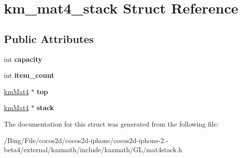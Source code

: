 \hypertarget{structkm__mat4__stack}{\section{km\-\_\-mat4\-\_\-stack Struct Reference}
\label{structkm__mat4__stack}
}
\subsection*{Public Attributes}
\begin{DoxyCompactItemize}
\item 
\hypertarget{structkm__mat4__stack_a069785a0a19481b635a91076f78547c7}{int {\bfseries capacity}}\label{structkm__mat4__stack_a069785a0a19481b635a91076f78547c7}

\item 
\hypertarget{structkm__mat4__stack_aa29b07b2cae7bb1a8fbb699ec0ee3383}{int {\bfseries item\-\_\-count}}\label{structkm__mat4__stack_aa29b07b2cae7bb1a8fbb699ec0ee3383}

\item 
\hypertarget{structkm__mat4__stack_a487ba8aa0a0176eb21899bd8bc38f153}{\hyperlink{structkm_mat4}{km\-Mat4} $\ast$ {\bfseries top}}\label{structkm__mat4__stack_a487ba8aa0a0176eb21899bd8bc38f153}

\item 
\hypertarget{structkm__mat4__stack_aa8b2b968718d212c80d7923d9de6a0a8}{\hyperlink{structkm_mat4}{km\-Mat4} $\ast$ {\bfseries stack}}\label{structkm__mat4__stack_aa8b2b968718d212c80d7923d9de6a0a8}

\end{DoxyCompactItemize}


The documentation for this struct was generated from the following file\-:\begin{DoxyCompactItemize}
\item 
/\-Bing/\-File/cocos2d/cocos2d-\/iphone/cocos2d-\/iphone-\/2.-\/beta4/external/kazmath/include/kazmath/\-G\-L/mat4stack.\-h\end{DoxyCompactItemize}
